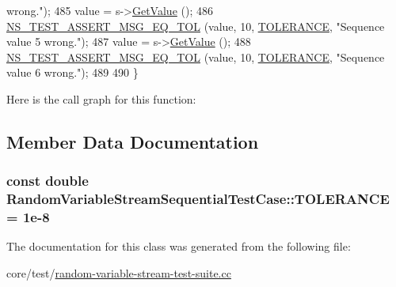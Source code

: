 \begin{DoxyCode}
{       wrong."}); 
485   value = s->\hyperlink{classns3_1_1SequentialRandomVariable_a78f36ee1a8102df7d7d40c4490ddf250}{GetValue} (); 
486   \hyperlink{group__testing_ga9e7861b56b4e70db3b56044cb7a28e41}{NS\_TEST\_ASSERT\_MSG\_EQ\_TOL} (value, 10, \hyperlink{classRandomVariableStreamSequentialTestCase_ad778eacda1b5bd5d31f802ad496db392}{TOLERANCE}, \textcolor{stringliteral}{"Sequence value 5
       wrong."}); 
487   value = s->\hyperlink{classns3_1_1SequentialRandomVariable_a78f36ee1a8102df7d7d40c4490ddf250}{GetValue} (); 
488   \hyperlink{group__testing_ga9e7861b56b4e70db3b56044cb7a28e41}{NS\_TEST\_ASSERT\_MSG\_EQ\_TOL} (value, 10, \hyperlink{classRandomVariableStreamSequentialTestCase_ad778eacda1b5bd5d31f802ad496db392}{TOLERANCE}, \textcolor{stringliteral}{"Sequence value 6
       wrong."}); 
489 
490 \}
\end{DoxyCode}


Here is the call graph for this function\+:




\subsection{Member Data Documentation}
\subsubsection[{\texorpdfstring{T\+O\+L\+E\+R\+A\+N\+CE}{TOLERANCE}}]{\setlength{\rightskip}{0pt plus 5cm}const double Random\+Variable\+Stream\+Sequential\+Test\+Case\+::\+T\+O\+L\+E\+R\+A\+N\+CE = 1e-\/8\hspace{0.3cm}{\ttfamily [static]}}\hypertarget{classRandomVariableStreamSequentialTestCase_ad778eacda1b5bd5d31f802ad496db392}{}\label{classRandomVariableStreamSequentialTestCase_ad778eacda1b5bd5d31f802ad496db392}


The documentation for this class was generated from the following file\+:\begin{DoxyCompactItemize}
\item 
core/test/\hyperlink{random-variable-stream-test-suite_8cc}{random-\/variable-\/stream-\/test-\/suite.\+cc}\end{DoxyCompactItemize}
